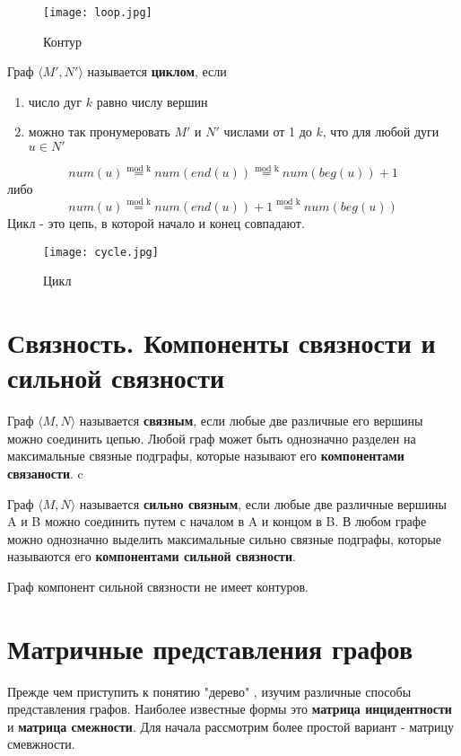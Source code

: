 \begin{figure}[h]
    \centering 
    \texttt{[image: loop.jpg]}
    \caption{Контур}
\end{figure}

\vspace{3mm}

Граф $\langle M', N'\rangle$ называется \textbf{циклом}, если
\begin{enumerate}
    \item число дуг $k$ равно числу вершин
    \item можно так пронумеровать $M'$ и $N'$ числами от 1 до $k$, что для любой дуги $u \in N'$
\end{enumerate}
\begin{equation}
    num(u) \stackrel{\text{mod k}}{=} num(end(u)) \stackrel{\text{mod k}}{=} num(beg(u)) + 1
\end{equation}
либо
\begin{equation}
    num(u) \stackrel{\text{mod k}}{=} num(end(u)) + 1 \stackrel{\text{mod k}}{=} num(beg(u))
\end{equation}
Цикл - это цепь, в которой начало и конец совпадают.
\begin{figure}[h]
    \centering 
    \texttt{[image: cycle.jpg]}
    \caption{Цикл}
\end{figure}

\section{Связность. Компоненты связности и сильной связности}
Граф $\langle M, N\rangle$ называется \textbf{связным}, если любые две различные его
вершины можно соединить цепью. Любой граф может быть однозначно разделен на максимальные
связные подграфы, которые называют его \textbf{компонентами связаности}.
c

Граф $\langle M, N\rangle$ называется \textbf{сильно связным}, если любые две различные
вершины A и B можно соединить путем с началом в A и концом в B. В любом графе можно однозначно
выделить максимальные сильно связные подграфы, которые называются его \textbf{компонентами сильной связности}.
\begin{thm}
    Граф компонент сильной связности не имеет контуров.
\end{thm}

\section{Матричные представления графов}
Прежде чем приступить к понятию "дерево" , изучим различные способы представления графов.
Наиболее известные формы это \textbf{матрица инцидентности} и \textbf{матрица смежности}.
Для начала рассмотрим более простой вариант - матрицу смевжности.

